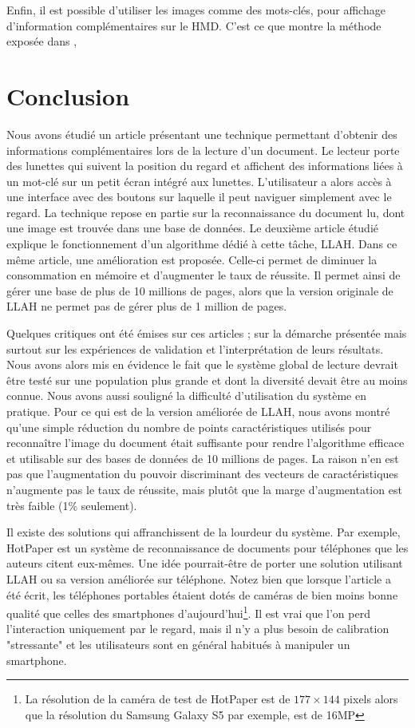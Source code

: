 \documentclass[a4paper]{article}
\begin{document}
Enfin, il est possible d'utiliser les images comme des mots-clés, pour affichage d'information complémentaires sur le HMD. C'est ce que montre la méthode exposée dans \cite{annotation}, 

\section{Conclusion}
Nous avons étudié un article présentant une technique permettant d'obtenir des informations complémentaires lors de la lecture d'un document. Le lecteur porte des lunettes qui suivent la position du regard et affichent des informations liées à un mot-clé sur un petit écran intégré aux lunettes. L'utilisateur a alors accès à une interface avec des boutons sur laquelle il peut naviguer simplement avec le regard. La technique repose en partie sur la reconnaissance du document lu, dont une image est trouvée dans une base de données. Le deuxième article étudié explique le fonctionnement d'un algorithme dédié à cette tâche, LLAH. Dans ce même article, une amélioration est proposée. Celle-ci permet de diminuer la consommation en mémoire et d'augmenter le taux de réussite. Il permet ainsi de gérer une base de plus de 10 millions de pages, alors que la version originale de LLAH ne permet pas de gérer plus de 1 million de pages.

Quelques critiques ont été émises sur ces articles ; sur la démarche présentée mais surtout sur les expériences de validation et l'interprétation de leurs résultats. Nous avons alors mis en évidence le fait que le système global de lecture devrait être testé sur une population plus grande et dont la diversité devait être au moins connue. Nous avons aussi souligné la difficulté d'utilisation du système en pratique. Pour ce qui est de la version améliorée de LLAH, nous avons montré qu'une simple réduction du nombre de points caractéristiques utilisés pour reconnaître l'image du document était suffisante pour rendre l'algorithme efficace et utilisable sur des bases de données de 10 millions de pages. La raison n'en est pas que l'augmentation du pouvoir discriminant des vecteurs de caractéristiques n'augmente pas le taux de réussite, mais plutôt que la marge d'augmentation est très faible (1\% seulement).

Il existe des solutions qui affranchissent de la lourdeur du système. Par exemple, HotPaper \cite{hotpaper} est un système de reconnaissance de documents pour téléphones que les auteurs citent eux-mêmes. Une idée pourrait-être de porter une solution utilisant LLAH ou sa version améliorée sur téléphone. Notez bien que lorsque l'article \cite{hotpaper} a été écrit, les téléphones portables étaient dotés de caméras de bien moins bonne qualité que celles des smartphones d'aujourd'hui\footnote{La résolution de la caméra de test de HotPaper est de $177 \times 144$ pixels alors que la résolution du Samsung Galaxy S5 par exemple, est de 16MP}. Il est vrai que l'on perd l'interaction uniquement par le regard, mais il n'y a plus besoin de calibration "stressante" et les utilisateurs sont en général habitués à manipuler un smartphone.
\end{document}
